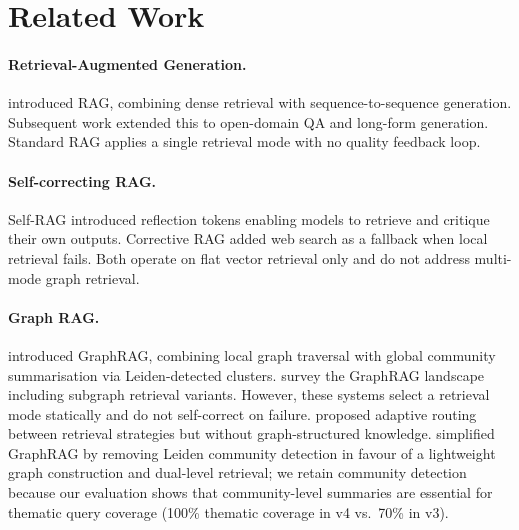 \documentclass[11pt]{article}
\begin{document}
\section{Related Work}
\label{sec:related}

\paragraph{Retrieval-Augmented Generation.}
\citet{lewis2020retrieval} introduced RAG, combining dense retrieval with
sequence-to-sequence generation. Subsequent work extended this to
open-domain QA \cite{karpukhin2020dense} and long-form generation.
Standard RAG applies a single retrieval mode with no quality feedback loop.

\paragraph{Self-correcting RAG.}
Self-RAG \cite{asai2023self} introduced reflection tokens enabling models
to retrieve and critique their own outputs. Corrective RAG
\cite{yan2024corrective} added web search as a fallback when local
retrieval fails. Both operate on flat vector retrieval only and do not
address multi-mode graph retrieval.

\paragraph{Graph RAG.}
\citet{edge2024local} introduced GraphRAG, combining local graph traversal
with global community summarisation via Leiden-detected clusters.
\citet{peng2024graphrag} survey the GraphRAG landscape including subgraph
retrieval variants. However, these systems select a retrieval mode
statically and do not self-correct on failure.
\citet{jeong2024adaptive} proposed adaptive routing between retrieval
strategies but without graph-structured knowledge.
\citet{lightrag2024} simplified GraphRAG by removing Leiden community
detection in favour of a lightweight graph construction and dual-level
retrieval; we retain community detection because our evaluation shows that
community-level summaries are essential for thematic query coverage (100\%
thematic coverage in v4 vs.\ 70\% in v3).
\end{document}

